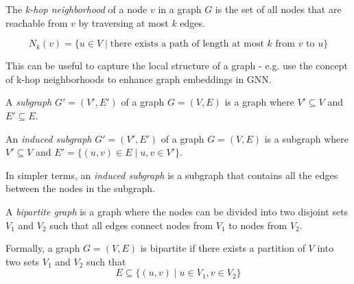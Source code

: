 \begin{definition}
    The \textit{k-hop neighborhood} of a node $v$ in a graph $G$ is the set of all nodes that are reachable from $v$ by traversing at most $k$ edges.

    $$
    N_k(v) = \{ u \in V \mid \text{there exists a path of length at most $k$ from $v$ to $u$} \}
    $$

    This can be useful to capture the local structure of a graph 
    - e.g. \cite{nikolentzos2019khop} use the concept of k-hop neighborhoods to enhance graph embeddings in \ac{GNN}.
\end{definition}

\begin{definition}[Subgraph]
    A \textit{subgraph} $G' = (V', E')$ of a graph $G = (V, E)$ is a graph where $V' \subseteq V$ and $E' \subseteq E$.
\end{definition}

\begin{definition}
    An \textit{induced subgraph} $G' = (V', E')$ of a graph $G = (V, E)$ is a subgraph where $V' \subseteq V$ and $E' = \{ (u, v) \in E \mid u, v \in V' \}$.

    In simpler terms, an \textit{induced subgraph} is a subgraph that contains all the edges between the nodes in the subgraph.
\end{definition}

\begin{definition}
    A \textit{bipartite graph} is a graph where the nodes can be divided into two disjoint sets $V_1$ and $V_2$ such that all edges connect nodes from $V_1$ to nodes from $V_2$.
    
    Formally, a graph $G = (V, E)$ is bipartite if there exists a partition of $V$ into two sets $V_1$ and $V_2$ such that
    $$E \subseteq \{ (u, v) \mid u \in V_1, v \in V_2 \}$$
\end{definition}

